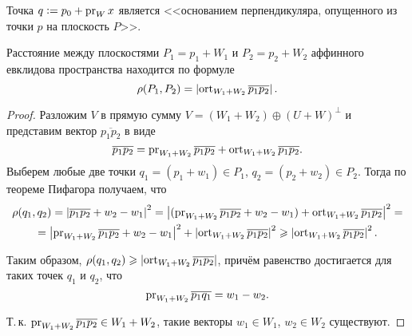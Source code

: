 Точка $q \vcentcolon = p_0 + \operatorname{pr}_Wx$ является <<основанием перпендикуляра, опущенного из точки $p$ на плоскость $P$>>.

\begin{theorem}
    Расстояние между плоскостями $P_1 = p_1 + W_1$ и $P_2 = p_2 + W_2$ аффинного евклидова пространства находится по формуле
    \[
        \rho(P_1, P_2) = \left\lvert\operatorname{ort}_{W_1 + W_2}\overline{p_1p_2}\right\rvert.
    \]
\end{theorem}

\begin{proof}
    Разложим $V$ в прямую сумму $V = (W_1 + W_2) \oplus (U + W)^\perp$ и представим вектор $\overline{p_1p_2}$ в виде
    \[
        \overline{p_1p_2} = \operatorname{pr}_{W_1 + W_2}\overline{p_1p_2} + \operatorname{ort}_{W_1 + W_2}\overline{p_1p_2}.
    \]
    Выберем любые две точки $q_1 = (p_1 + w_1) \in P_1$, $q_2 = (p_2 + w_2) \in P_2$. Тогда по теореме Пифагора получаем, что
    \begin{multline*}
        \rho(q_1, q_2) = \left\lvert\overline{p_1p_2} + w_2 - w_1\right\rvert^2 = \left\lvert(\operatorname{pr}_{W_1 + W_2}\overline{p_1p_2} + w_2 - w_1) + \operatorname{ort}_{W_1 + W_2}\overline{p_1p_2}\right\rvert^2 =\\ = \left\lvert\operatorname{pr}_{W_1 + W_2}\overline{p_1p_2} + w_2 - w_1\right\rvert^2 + \left\lvert\operatorname{ort}_{W_1 + W_2}\overline{p_1p_2}\right\rvert^2 \geqslant \left\lvert\operatorname{ort}_{W_1 + W_2}\overline{p_1p_2}\right\rvert^2.
    \end{multline*}

    Таким образом, $\rho(q_1, q_2) \geqslant \left\lvert\operatorname{ort}_{W_1 + W_2}\overline{p_1p_2}\right\rvert$, причём равенство достигается для таких точек $q_1$ и $q_2$, что
    \[
        \operatorname{pr}_{W_1 + W_2}\overline{p_1q_1} = w_1 - w_2.
    \]

    Т.\,к. $\operatorname{pr}_{W_1 + W_2}\overline{p_1p_2} \in W_1 + W_2$, такие векторы $w_1 \in W_1$, $w_2 \in W_2$ существуют.
\end{proof}

